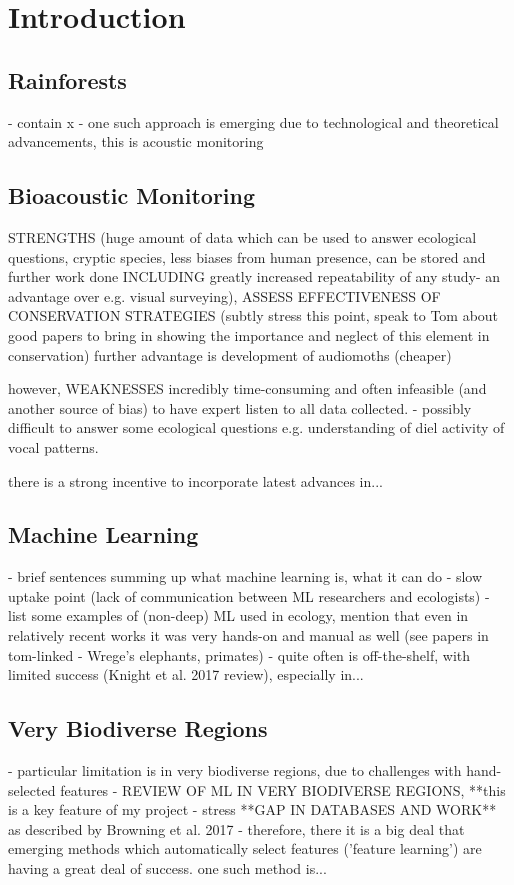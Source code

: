 \documentclass[11pt]{article}
\begin{document}
\section{Introduction}
\subsection{Rainforests}
- contain x%
- one such approach is emerging due to technological and theoretical advancements, this is acoustic monitoring

\subsection{Bioacoustic Monitoring}
STRENGTHS
(huge amount of data which can be used to answer ecological questions, cryptic species, less biases from human presence, can be stored and further work done INCLUDING greatly increased repeatability of any study- an advantage over e.g. visual surveying), ASSESS EFFECTIVENESS OF CONSERVATION STRATEGIES (subtly stress this point, speak to Tom about good papers to bring in showing the importance and neglect of this element in conservation) 
further advantage is development of audiomoths (cheaper) 

however, 
WEAKNESSES
incredibly time-consuming and often infeasible (and another source of bias) to have expert listen to all data collected.
- possibly difficult to answer some ecological questions e.g. understanding of diel activity of vocal patterns. 

there is a strong incentive to incorporate latest advances in...

\subsection{Machine Learning}
- brief sentences summing up what machine learning is, what it can do
- slow uptake point (lack of communication between ML researchers and ecologists)
- list some examples of (non-deep) ML used in ecology, mention that even in relatively recent works it was very hands-on and manual as well (see papers in tom-linked - Wrege's elephants, primates)
- quite often is off-the-shelf, with limited success (Knight et al. 2017 review), especially in...

\subsection{Very Biodiverse Regions}
- particular limitation is in very biodiverse regions, due to challenges with hand-selected features
- REVIEW OF ML IN VERY BIODIVERSE REGIONS, **this is a key feature of my project
- stress **GAP IN DATABASES AND WORK** as described by Browning et al. 2017
- therefore, there it is a big deal that emerging methods which automatically select features ('feature learning') are having a great deal of success. one such method is...
\end{document}
